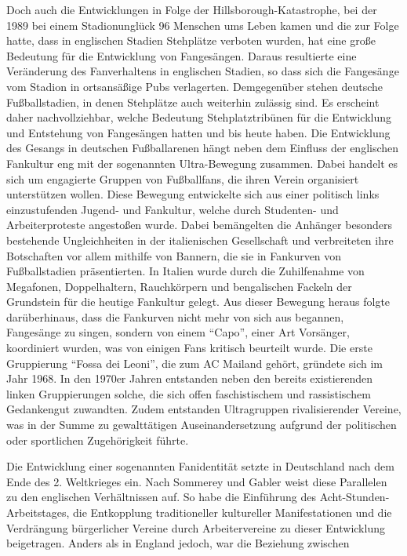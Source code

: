 Doch auch die Entwicklungen in Folge der Hillsborough-Katastrophe, bei der 1989 bei einem Stadionunglück 96 Menschen ums Leben kamen und die zur Folge hatte, dass in englischen Stadien Stehplätze verboten wurden, hat eine große Bedeutung für die Entwicklung von Fangesängen.
Daraus resultierte eine Veränderung des Fanverhaltens in englischen Stadien, so dass sich die Fangesänge vom Stadion in ortsansäßige Pubs verlagerten.
Demgegenüber stehen deutsche Fußballstadien, in denen Stehplätze auch weiterhin zulässig sind.
Es erscheint daher nachvollziehbar, welche Bedeutung Stehplatztribünen für die Entwicklung und Entstehung von Fangesängen hatten und bis heute haben.
Die Entwicklung des Gesangs in deutschen Fußballarenen hängt neben dem Einfluss der englischen Fankultur eng mit der sogenannten Ultra-Bewegung zusammen.
Dabei handelt es sich um engagierte Gruppen von Fußballfans, die ihren Verein organisiert unterstützen wollen.
Diese Bewegung entwickelte sich aus einer politisch links einzustufenden Jugend- und Fankultur, welche durch Studenten- und Arbeiterproteste angestoßen wurde.
Dabei bemängelten die Anhänger besonders bestehende Ungleichheiten in der italienischen Gesellschaft und verbreiteten ihre Botschaften vor allem mithilfe von Bannern, die sie in Fankurven von Fußballstadien präsentierten.
In Italien wurde durch die Zuhilfenahme von Megafonen, Doppelhaltern, Rauchkörpern und bengalischen Fackeln der Grundstein für die heutige Fankultur gelegt.
Aus dieser Bewegung heraus folgte darüberhinaus, dass die Fankurven nicht mehr von sich aus begannen, Fangesänge zu singen, sondern von einem "`Capo"', einer Art Vorsänger, koordiniert wurden, was von einigen Fans kritisch beurteilt wurde.
Die erste Gruppierung "`Fossa dei Leoni"', die zum AC Mailand gehört, gründete sich im Jahr 1968.
In den 1970er Jahren entstanden neben den bereits existierenden linken Gruppierungen solche, die sich offen faschistischem und rassistischem Gedankengut zuwandten.
Zudem entstanden Ultragruppen rivalisierender Vereine, was in der Summe zu gewalttätigen Auseinandersetzung aufgrund der politischen oder sportlichen Zugehörigkeit führte.

Die Entwicklung einer sogenannten Fanidentität setzte in Deutschland nach dem Ende des 2. Weltkrieges ein.
Nach Sommerey und Gabler weist diese Parallelen zu den englischen Verhältnissen auf.
So habe die Einführung des Acht-Stunden-Arbeitstages, die Entkopplung traditioneller kultureller Manifestationen und die Verdrängung bürgerlicher Vereine durch Arbeitervereine zu dieser Entwicklung beigetragen.
Anders als in England jedoch, war die Beziehung zwischen